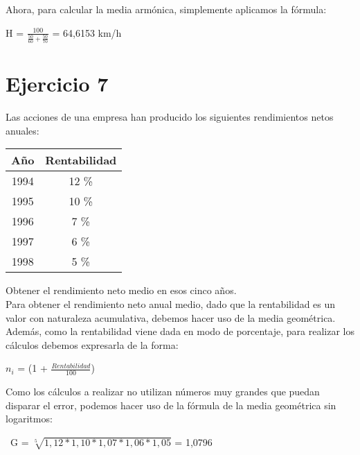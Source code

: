 \documentclass[a4paper,12pt]{article}
\begin{document}
Ahora, para calcular la media armónica, simplemente aplicamos la fórmula: \\


\begin {center}
    \begin{tabular}{}
    H = $\frac{100}{\frac{50}{60} + \frac{50}{70}}$ = 64,6153 km/h
    \end{tabular}
\end {center}

\section*{Ejercicio 7}
Las acciones de una empresa han producido los siguientes rendimientos netos anuales:

\begin{center}
    \begin{tabular}{|c|c|}
        \hline
        Año & Rentabilidad \\
        \hline
        1994 & 12 \% \\
        1995 & 10 \% \\
        1996 & 7 \% \\
        1997 & 6 \% \\
        1998 & 5 \% \\
        \hline
    \end{tabular}
\end{center}

Obtener el rendimiento neto medio en esos cinco años. \\

Para obtener el rendimiento neto anual medio, dado que la rentabilidad es un valor con naturaleza acumulativa, debemos hacer uso de la media geométrica. Además, como la rentabilidad viene dada en modo de porcentaje, para realizar los cálculos debemos expresarla de la forma:
    

\begin{center}
    \begin{tabular}    
            $n_i$ = (1 + $\frac{Rentabilidad}{100}$) \\
    \end{tabular}
\end{center}

Como los cálculos a realizar no utilizan números muy grandes que puedan disparar el error, podemos hacer uso de la fórmula de la media geométrica sin logaritmos: 

\begin{center}
    \begin{tabular}    
            \ G = $\sqrt[5]{1,12 * 1,10 * 1,07 * 1,06 * 1,05}$ = 1,0796 \\
    \end{tabular}
\end{center}
\end{document}
